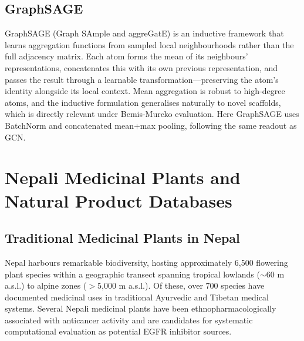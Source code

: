 \subsection{GraphSAGE}

GraphSAGE (Graph SAmple and aggreGatE) \parencite{hamilton2017graphsage} is an
inductive framework that learns aggregation functions from sampled local
neighbourhoods rather than the full adjacency matrix. Each atom forms the mean of its
neighbours' representations, concatenates this with its own previous representation,
and passes the result through a learnable transformation---preserving the atom's
identity alongside its local context. Mean aggregation is robust to high-degree atoms,
and the inductive formulation generalises naturally to novel scaffolds, which is
directly relevant under Bemis-Murcko evaluation. Here GraphSAGE uses BatchNorm and
concatenated mean+max pooling, following the same readout as GCN.

\section{Nepali Medicinal Plants and Natural Product Databases}
\label{sec:nepali_plants}

\subsection{Traditional Medicinal Plants in Nepal}

Nepal harbours remarkable biodiversity, hosting approximately 6,500 flowering plant
species within a geographic transect spanning tropical lowlands ($\sim$60 m a.s.l.)
to alpine zones ($>$5,000 m a.s.l.). Of these, over 700 species have documented
medicinal uses in traditional Ayurvedic and Tibetan medical systems.
Several Nepali medicinal plants have been
ethnopharmacologically associated with anticancer activity and are candidates
for systematic computational evaluation as potential EGFR inhibitor sources.

